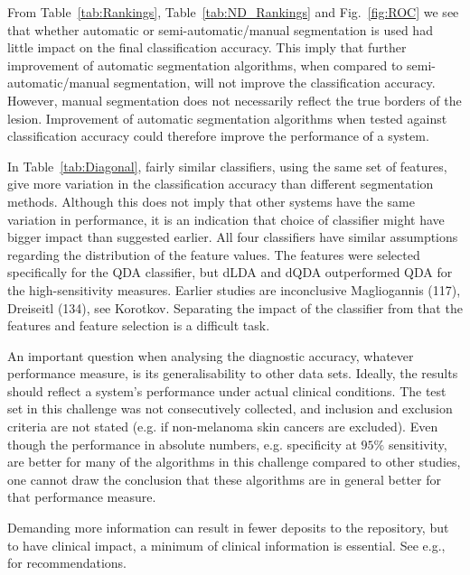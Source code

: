 \documentclass[a4paper,12pt]{article}
\begin{document}
From Table~\ref{tab:Rankings}, Table~\ref{tab:ND_Rankings} and Fig.~\ref{fig:ROC} we see that whether automatic or semi-automatic/manual segmentation is used had little impact on the final classification accuracy.
This imply that further improvement of automatic segmentation algorithms, when compared to semi-automatic/manual segmentation,  will not improve the classification accuracy.
However, manual segmentation does not necessarily reflect the true borders of the lesion.
Improvement of automatic segmentation algorithms when tested against classification accuracy could therefore improve the performance of a system. 

In Table~\ref{tab:Diagonal}, fairly similar classifiers, using the same set of features, give more variation in the classification accuracy than different segmentation methods. 
Although this does not imply that other systems have the same variation in performance, it is an indication that choice of classifier might have bigger impact than suggested earlier.  
All four classifiers have similar assumptions regarding the distribution of the feature values. 
The features were selected specifically for the QDA classifier, but dLDA and dQDA outperformed QDA for the high-sensitivity measures. 
Earlier studies are inconclusive {\color{red} Magliogannis (117), Dreiseitl (134), see Korotkov}.
Separating the impact of the classifier from that the features and feature selection is a difficult task.

An important question when analysing the diagnostic accuracy, whatever performance measure, is its generalisability to other data sets. 
Ideally, the results should reflect a system's performance under actual clinical conditions. 
The test set in this challenge was not consecutively collected, and inclusion and exclusion criteria are not stated (e.g. if non-melanoma skin cancers are excluded). Even though the performance in absolute numbers, e.g. specificity at $95\%$ sensitivity, are better for many of the algorithms in this challenge compared to other studies, one cannot draw the conclusion that these algorithms are in general better for that performance measure. 


Demanding more information can result in fewer deposits to the repository, but to have clinical impact, a minimum of clinical information is essential. 
See e.g., \citep{Malvehy2007Dermoscopy} for recommendations. 
 
\end{document}
